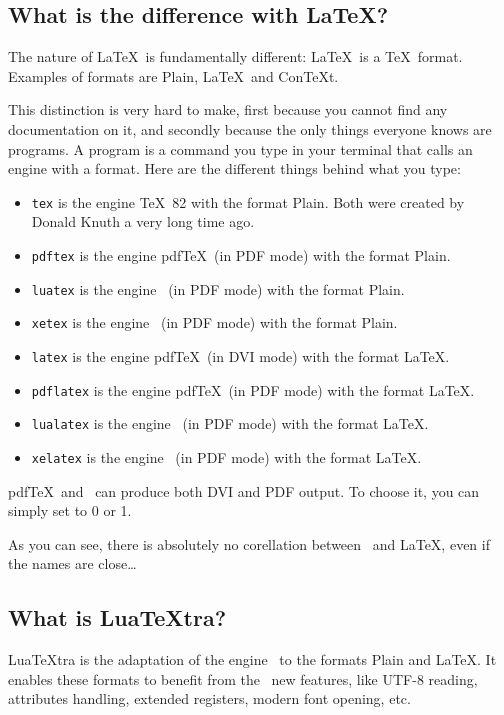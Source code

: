 \documentclass{article}
\makeatletter
\newlength\xxt@kern@Te
\newlength\xxt@kern@eX
\newlength\xxt@lower@e
\DeclareRobustCommand\XeTeX{%
  \leavevmode
  \smash{%
   X\lower\xxt@lower@e
   \hbox{\kern\xxt@kern@eX
   \setbox0=\hbox{E}\dimen0=\ht0\advance\dimen0by\dp0%
   \raise\dimen0\hbox{\rotatebox{180}{\box0}}%
   }\kern\xxt@kern@Te\TeX}}%
\makeatother
\begin{document}
\subsection{What is the difference with \LaTeX ?}

The nature of \LaTeX\ is fundamentally different: \LaTeX\ is a \TeX\ format. Examples of formats are Plain, \LaTeX\ and Con\TeX t.

This distinction is very hard to make, first because you cannot find any documentation on it, and secondly because the only things everyone knows are programs. A program is a command you type in your terminal that calls an engine with a format. Here are the different things behind what you type:

\begin{itemize}
\item \texttt{tex} is the engine \TeX\ 82 with the format Plain. Both were created by Donald Knuth a very long time ago.
\item \texttt{pdftex} is the engine pdf\TeX\ (in PDF mode) with the format Plain.
\item \texttt{luatex} is the engine \LuaTeX\ (in PDF mode) with the format Plain.
\item \texttt{xetex} is the engine \XeTeX\ (in PDF mode) with the format Plain.
\item \texttt{latex} is the engine pdf\TeX\ (in DVI mode) with the format \LaTeX .
\item \texttt{pdflatex} is the engine pdf\TeX\ (in PDF mode) with the format \LaTeX .
\item \texttt{lualatex} is the engine \LuaTeX\ (in PDF mode) with the format \LaTeX .
\item \texttt{xelatex} is the engine \XeTeX\ (in PDF mode) with the format \LaTeX .
\end{itemize}

pdf\TeX\ and \LuaTeX\ can produce both DVI and PDF output. To choose it, you can simply set \texttt{\string\pdfoutput} to 0 or 1.

As you can see, there is absolutely no corellation between \LuaTeX\ and \LaTeX , even if the names are close\dots

\subsection{What is Lua\TeX tra?\label{sub:luatextra}}

Lua\TeX tra is the adaptation of the engine \LuaTeX\ to the formats Plain and \LaTeX . It enables these formats to benefit from the \LuaTeX\ new features, like UTF-8 reading, attributes handling, extended registers, modern font opening, etc.
\end{document}

